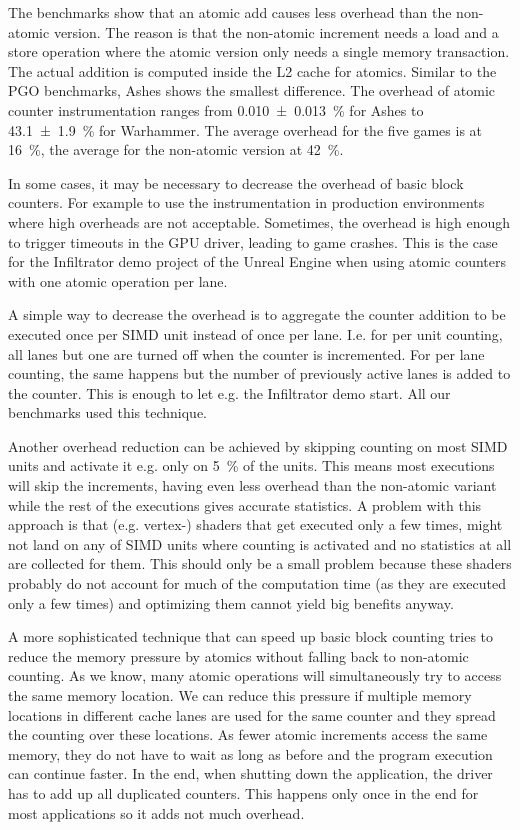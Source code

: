 \begin{table}
	\centering
	\label{tab:overhead}
\end{table}

The benchmarks show that an atomic add causes less overhead than the non-atomic version.
The reason is that the non-atomic increment needs a load and a store operation where the atomic version only needs a single memory transaction. The actual addition is computed inside the L2 cache for atomics.
Similar to the PGO benchmarks, Ashes shows the smallest difference.
The overhead of atomic counter instrumentation ranges from \SI{0.010 \pm 0.013}{\percent} for Ashes to \SI{43.1 \pm 1.9}{\percent} for Warhammer.
The average overhead for the five games is at \SI{16}{\percent}, the average for the non-atomic version at \SI{42}{\percent}.

In some cases, it may be necessary to decrease the overhead of basic block counters. For example to use the instrumentation in production environments where high overheads are not acceptable.
Sometimes, the overhead is high enough to trigger timeouts in the GPU driver, leading to game crashes. This is the case for the Infiltrator demo project of the Unreal Engine when using atomic counters with one atomic operation per lane.

A simple way to decrease the overhead is to aggregate the counter addition to be executed once per SIMD unit instead of once per lane.
I.e. for per unit counting, all lanes but one are turned off when the counter is incremented.
For per lane counting, the same happens but the number of previously active lanes is added to the counter.
This is enough to let e.g. the Infiltrator demo start.
All our benchmarks used this technique.

Another overhead reduction can be achieved by skipping counting on most SIMD units and activate it e.g. only on \SI{5}{\percent} of the units.
This means most executions will skip the increments, having even less overhead than the non-atomic variant while the rest of the executions gives accurate statistics.
A problem with this approach is that (e.g. vertex-) shaders that get executed only a few times, might not land on any of SIMD units where counting is activated and no statistics at all are collected for them.
This should only be a small problem because these shaders probably do not account for much of the computation time (as they are executed only a few times) and optimizing them cannot yield big benefits anyway.

A more sophisticated technique that can speed up basic block counting tries to reduce the memory pressure by atomics without falling back to non-atomic counting.
As we know, many atomic operations will simultaneously try to access the same memory location.
We can reduce this pressure if multiple memory locations in different cache lanes are used for the same counter and they spread the counting over these locations.
As fewer atomic increments access the same memory, they do not have to wait as long as before and the program execution can continue faster.
In the end, when shutting down the application, the driver has to add up all duplicated counters.
This happens only once in the end for most applications so it adds not much overhead.
